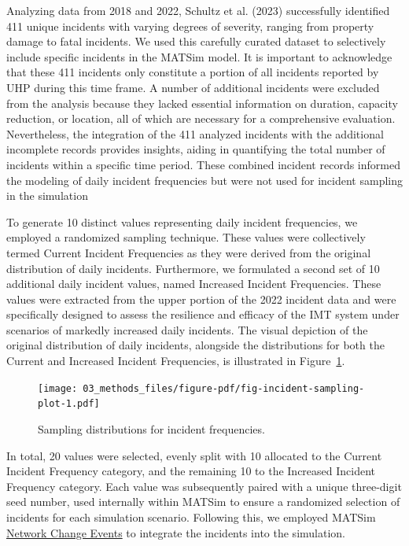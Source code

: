 \documentclass[fancy, oneside, mastersfancy, ms]{byuthesis}
\begin{document}
Analyzing data from 2018 and 2022, Schultz et al. (2023) successfully
identified 411 unique incidents with varying degrees of severity,
ranging from property damage to fatal incidents. We used this carefully
curated dataset to selectively include specific incidents in the MATSim
model. It is important to acknowledge that these 411 incidents only
constitute a portion of all incidents reported by UHP during this time
frame. A number of additional incidents were excluded from the analysis
because they lacked essential information on duration, capacity
reduction, or location, all of which are necessary for a comprehensive
evaluation. Nevertheless, the integration of the 411 analyzed incidents
with the additional incomplete records provides insights, aiding in
quantifying the total number of incidents within a specific time period.
These combined incident records informed the modeling of daily incident
frequencies but were not used for incident sampling in the simulation

To generate 10 distinct values representing daily incident frequencies,
we employed a randomized sampling technique. These values were
collectively termed Current Incident Frequencies as they were derived
from the original distribution of daily incidents. Furthermore, we
formulated a second set of 10 additional daily incident values, named
Increased Incident Frequencies. These values were extracted from the
upper portion of the 2022 incident data and were specifically designed
to assess the resilience and efficacy of the IMT system under scenarios
of markedly increased daily incidents. The visual depiction of the
original distribution of daily incidents, alongside the distributions
for both the Current and Increased Incident Frequencies, is illustrated
in Figure~\ref{fig-incident-sampling-plot}.

\begin{figure}

{\centering \texttt{[image: 03\_methods\_files/figure-pdf/fig-incident-sampling-plot-1.pdf]}

}

\caption{\label{fig-incident-sampling-plot}Sampling distributions for
incident frequencies.}

\end{figure}

In total, 20 values were selected, evenly split with 10 allocated to the
Current Incident Frequency category, and the remaining 10 to the
Increased Incident Frequency category. Each value was subsequently
paired with a unique three-digit seed number, used internally within
MATSim to ensure a randomized selection of incidents for each simulation
scenario. Following this, we employed MATSim
\protect\hyperlink{sec-NCE}{Network Change Events} to integrate the
incidents into the simulation.
\end{document}
